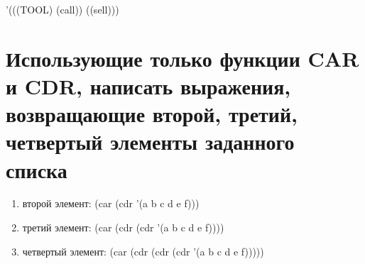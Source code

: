 '(((TOOL) (call)) ((sell)))
\begin{figure}[H]
	\end{figure} 

\section{Использующие только функции CAR и CDR, написать выражения, возвращающие второй, третий, четвертый элементы заданного списка}

\begin{enumerate}
	\item второй элемент: (car (cdr '(a b c d e f)))
	\item третий элемент: (car (cdr (cdr '(a b c d e f))))
	\item четвертый элемент: (car (cdr (cdr (cdr '(a b c d e f)))))
\end{enumerate}

